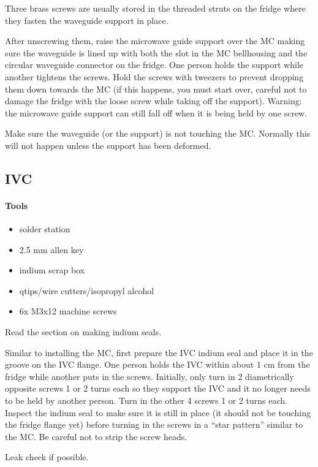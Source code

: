 Three brass screws are usually stored in the threaded struts on the fridge where they fasten the waveguide support in place.

After unscrewing them, raise the microwave guide support over the MC making sure the waveguide is lined up with both the slot in the MC bellhousing and the circular waveguide connector on the fridge.  One person holds the support while another tightens the screws.  Hold the screws with tweezers to prevent dropping them down towards the MC (if this happens, you must start over, careful not to damage the fridge with the loose screw while taking off the support).  Warning: the microwave guide support can still fall off when it is being held by one screw.

Make sure the waveguide (or the support) is not touching the MC.  Normally this will not happen unless the support has been deformed.

  \subsection{IVC}

\paragraph{Tools}
\begin{itemize}
 \item solder station
\item 2.5 mm allen key
\item indium scrap box
\item qtips/wire cutters/isopropyl alcohol
\item 6x M3x12 machine screws
\end{itemize}

Read the section on making indium seals.

Similar to installing the MC, first prepare the IVC indium seal and place it in the groove on the IVC flange.  One person holds the IVC within about 1 cm from the fridge while another puts in the screws.  Initially, only turn in 2 diametrically opposite screws 1 or 2 turns each so they support the IVC and it no longer needs to be held by another person.  Turn in the other 4 screws 1 or 2 turns each.  Inspect the indium seal to make sure it is still in place (it should not be touching the fridge flange yet) before turning in the screws in a ``star pattern'' similar to the MC.  Be careful not to strip the screw heads.


Leak check if possible.



